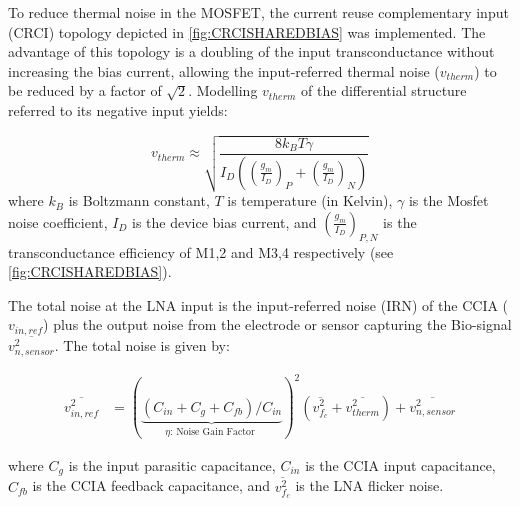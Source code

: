 


To reduce thermal noise in the MOSFET, the current reuse complementary input (CRCI) topology depicted in \cref{fig:CRCISHAREDBIAS} was implemented. The advantage of this topology is a doubling of the input transconductance without increasing the bias current, allowing the input-referred thermal noise ($v_{therm}$) to be reduced by a factor of $\sqrt{2}$. Modelling $v_{therm}$ of the differential structure referred to its negative input yields:

{\small
\begin{equation}
    v_{therm} \approx \sqrt{\frac{8 k_B T\gamma}{I_{D} \left(\left( \frac{g_m}{I_D} \right)_P+\left(\frac{g_m}{I_D} \right)_N \right) }}\label{eq:vinamp}
\end{equation}
}%
where $k_B$ is Boltzmann constant, $T$ is temperature (in Kelvin), $\gamma$ is the Mosfet noise coefficient, $I_D$ is the device bias current, and $\left(\frac{g_m}{I_D}\right)_{P,N}$ is the transconductance efficiency of M1,2 and M3,4 respectively (see \cref{fig:CRCISHAREDBIAS}).

The total noise at the LNA input is the input-referred noise (IRN) of the CCIA ($v_{in,ref}$) plus the output noise from the electrode or sensor capturing the Bio-signal $\overline{v_{n,sensor}^2}$. The total noise is given by:

{\footnotesize
\begin{align}
\overline{v_{in,ref}^2} &= \left(\underbrace{(C_{in} + C_{g} + C_{fb})/C_{in}}_{\eta\text{: Noise Gain Factor }}\right)^2\left(\overline{v_{f_c}^2} + \overline{v_{therm}^2}\right) + \overline{v_{n,sensor}^2} \label{eq:system_noise}
\end{align}
}%

where $C_g$ is the input parasitic capacitance, $C_{in}$ is the CCIA input capacitance, $C_{fb}$ is the CCIA feedback capacitance, and $\overline{v_{f_c}^2}$ is the LNA flicker noise.

